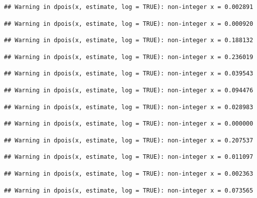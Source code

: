 \documentclass[]{article}
\begin{document}
\begin{verbatim}
## Warning in dpois(x, estimate, log = TRUE): non-integer x = 0.002891
\end{verbatim}

\begin{verbatim}
## Warning in dpois(x, estimate, log = TRUE): non-integer x = 0.000920
\end{verbatim}

\begin{verbatim}
## Warning in dpois(x, estimate, log = TRUE): non-integer x = 0.188132
\end{verbatim}

\begin{verbatim}
## Warning in dpois(x, estimate, log = TRUE): non-integer x = 0.236019
\end{verbatim}

\begin{verbatim}
## Warning in dpois(x, estimate, log = TRUE): non-integer x = 0.039543
\end{verbatim}

\begin{verbatim}
## Warning in dpois(x, estimate, log = TRUE): non-integer x = 0.094476
\end{verbatim}

\begin{verbatim}
## Warning in dpois(x, estimate, log = TRUE): non-integer x = 0.028983
\end{verbatim}

\begin{verbatim}
## Warning in dpois(x, estimate, log = TRUE): non-integer x = 0.000000
\end{verbatim}

\begin{verbatim}
## Warning in dpois(x, estimate, log = TRUE): non-integer x = 0.207537
\end{verbatim}

\begin{verbatim}
## Warning in dpois(x, estimate, log = TRUE): non-integer x = 0.011097
\end{verbatim}

\begin{verbatim}
## Warning in dpois(x, estimate, log = TRUE): non-integer x = 0.002363
\end{verbatim}

\begin{verbatim}
## Warning in dpois(x, estimate, log = TRUE): non-integer x = 0.073565
\end{verbatim}
\end{document}
